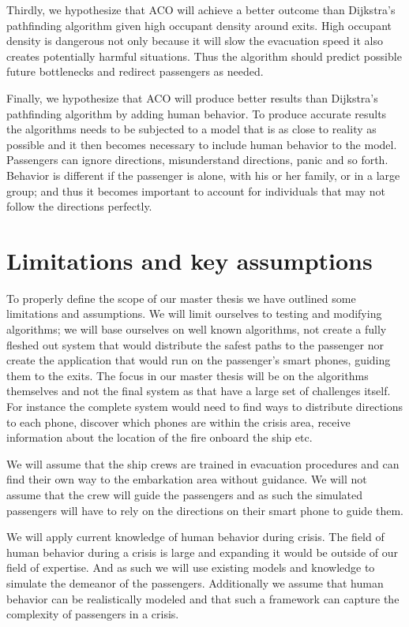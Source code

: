 Thirdly, we hypothesize that ACO will achieve a better outcome than Dijkstra's pathfinding algorithm
given high occupant density around exits. High occupant density is dangerous not only
because it will slow the evacuation speed it also creates potentially harmful situations. Thus the algorithm
should predict possible future bottlenecks and redirect passengers as needed.

Finally, we hypothesize that ACO will produce better results than Dijkstra's pathfinding algorithm                 
by adding human behavior. To produce accurate results the algorithms needs to be subjected
to a model that is as close to reality as possible and it then becomes necessary to include
human behavior to the model. Passengers can ignore directions, misunderstand directions, panic
and so forth. Behavior is different if the passenger is alone, with his or her family, or in a large group;
and thus it becomes important to account for individuals that may not follow the directions perfectly.

\section{Limitations and key assumptions}

To properly define the scope of our master thesis we have outlined                                                                              
some limitations and assumptions. We will limit ourselves to testing and modifying algorithms;                                  
we will base ourselves on well known algorithms, not create a fully fleshed out system that would distribute the 
safest paths to the passenger nor create the application that would run on the passenger's smart phones, guiding them to the exits.
The focus in our master thesis will be on the algorithms themselves and not the final system as that have a large set
of challenges itself. For instance the complete system would need to find ways to distribute directions to each phone,
discover which phones are within the crisis area, receive information about the location of the fire onboard the ship etc.

We will assume that the ship crews are trained in evacuation procedures and can find their own way to the embarkation area without guidance.
We will not assume that the crew will guide the passengers and as such the simulated passengers will have to rely on the directions on 
their smart phone to guide them. 

We will apply current knowledge of human behavior during crisis. The field of human behavior during a crisis is large
and expanding it would be outside of our field of expertise. And as such we will use existing models and knowledge
to simulate the demeanor of the passengers. Additionally we assume that human behavior can be realistically modeled
and that such a framework can capture the complexity of passengers in a crisis.

